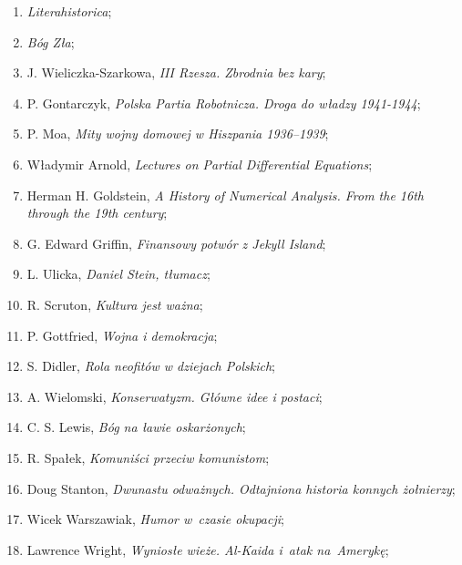 \documentclass[a4paper,11pt]{article}
\begin{document}
\begin{enumerate}
\item \textit{Literahistorica};

\item \textit{Bóg Zła};

\item J. Wieliczka-Szarkowa, \textit{III Rzesza. Zbrodnia bez kary};

\item P. Gontarczyk, \textit{Polska Partia Robotnicza. Droga do władzy
    1941-1944};

\item P. Moa, \textit{Mity wojny domowej w Hiszpania 1936--1939};

\item Władymir Arnold, \textit{Lectures on Partial Differential
    Equations};

\item Herman H. Goldstein, \textit{A History of Numerical Analysis. From
    the 16th through the 19th century};

\item G. Edward Griffin, \textit{Finansowy potwór z Jekyll Island};

\item L. Ulicka, \textit{Daniel Stein, tłumacz};

\item R. Scruton, \textit{Kultura jest ważna};

\item P. Gottfried, \textit{Wojna i demokracja};

\item S. Didler, \textit{Rola neofitów w dziejach Polskich};

\item A. Wielomski, \textit{Konserwatyzm. Główne idee i postaci};

\item C. S. Lewis, \textit{Bóg na ławie oskarżonych};

\item R. Spałek, \textit{Komuniści przeciw komunistom};

\item Doug Stanton, \textit{Dwunastu odważnych. Odtajniona historia
    konnych żołnierzy};

\item Wicek Warszawiak, \textit{Humor w~czasie okupacji};

\item Lawrence Wright, \textit{Wyniosłe wieże. Al-Kaida i~atak
    na~Amerykę};


\end{enumerate}
\end{document}
